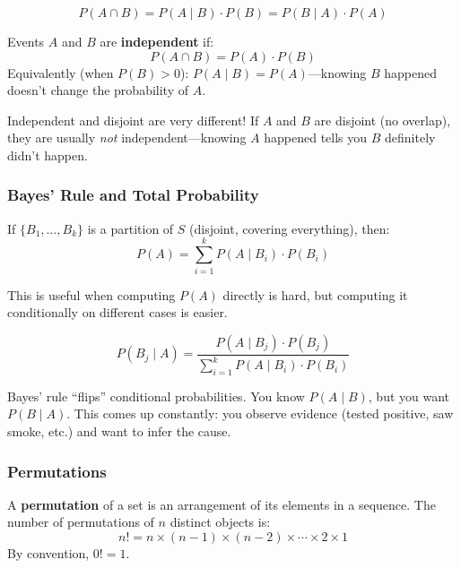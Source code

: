 \begin{theorem}
\[
P(A \cap B) = P(A \mid B) \cdot P(B) = P(B \mid A) \cdot P(A)
\]
\end{theorem}

\begin{definition}[Independence]
Events $A$ and $B$ are \textbf{independent} if:
\[
P(A \cap B) = P(A) \cdot P(B)
\]
Equivalently (when $P(B) > 0$): $P(A \mid B) = P(A)$---knowing $B$ happened doesn't change the probability of $A$.
\end{definition}

\begin{warning}
Independent and disjoint are very different! If $A$ and $B$ are disjoint (no overlap), they are usually \emph{not} independent---knowing $A$ happened tells you $B$ definitely didn't happen.
\end{warning}

\subsubsection*{Bayes' Rule and Total Probability}

\begin{theorem}
If $\{B_1, \ldots, B_k\}$ is a partition of $S$ (disjoint, covering everything), then:
\[
P(A) = \sum_{i=1}^{k} P(A \mid B_i) \cdot P(B_i)
\]
\end{theorem}

This is useful when computing $P(A)$ directly is hard, but computing it conditionally on different cases is easier.

\begin{theorem}
\[
P(B_j \mid A) = \frac{P(A \mid B_j) \cdot P(B_j)}{\sum_{i=1}^{k} P(A \mid B_i) \cdot P(B_i)}
\]
\end{theorem}

Bayes' rule ``flips'' conditional probabilities. You know $P(A \mid B)$, but you want $P(B \mid A)$. This comes up constantly: you observe evidence (tested positive, saw smoke, etc.) and want to infer the cause.

\subsubsection*{Permutations}

\begin{definition}[Permutation]
A \textbf{permutation} of a set is an arrangement of its elements in a sequence. The number of permutations of $n$ distinct objects is:
\[
n! = n \times (n-1) \times (n-2) \times \cdots \times 2 \times 1
\]
By convention, $0! = 1$.
\end{definition}

